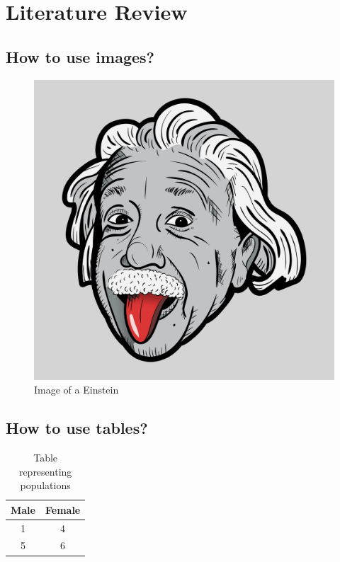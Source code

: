 \documentclass[a4paper, 12pt]{report}
\begin{document}
\chapter{Literature Review}
\section{How to use images?}
\begin{figure}[h]
    \centering
    \includegraphics[scale=0.1]{images/einstein.jpg}
    \caption{Image of a Einstein}
    \label{fig:einstein}
\end{figure}

\section{How to use tables?}
\begin{table}[htb]
    \centering
    \begin{tabular}{|c|c|}
        \hline
         Male & Female \\
         \hline
         1 & 4\\
         \hline
         5 & 6\\
         \hline
    \end{tabular}
    \caption{Table representing populations}
    \label{tab:population}
\end{table}
\end{document}
